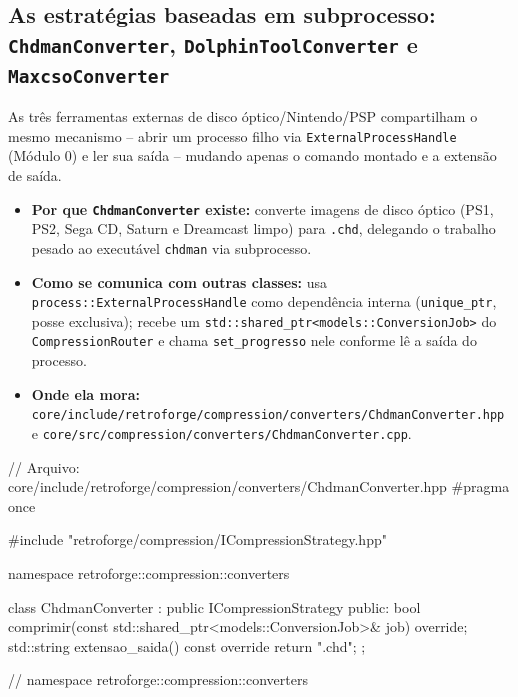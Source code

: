 \subsection{As estratégias baseadas em subprocesso: \texttt{ChdmanConverter}, \texttt{DolphinToolConverter} e \texttt{MaxcsoConverter}}

As três ferramentas externas de disco óptico/Nintendo/PSP compartilham o mesmo mecanismo -- abrir um processo filho via \texttt{ExternalProcessHandle} (Módulo 0) e ler sua saída -- mudando apenas o comando montado e a extensão de saída.

\begin{itemize}
    \item \textbf{Por que \texttt{ChdmanConverter} existe:} converte imagens de disco óptico (PS1, PS2, Sega CD, Saturn e Dreamcast limpo) para \texttt{.chd}, delegando o trabalho pesado ao executável \texttt{chdman} via subprocesso.
    \item \textbf{Como se comunica com outras classes:} usa \texttt{process::ExternalProcessHandle} como dependência interna (\texttt{unique\_ptr}, posse exclusiva); recebe um \texttt{std::shared\_ptr<models::ConversionJob>} do \texttt{CompressionRouter} e chama \texttt{set\_progresso} nele conforme lê a saída do processo.
    \item \textbf{Onde ela mora:} \texttt{core/include/retroforge/compression/converters/ChdmanConverter.hpp} e \texttt{core/src/compression/converters/ChdmanConverter.cpp}.
\end{itemize}

\begin{CaixaCodigo}
// Arquivo: core/include/retroforge/compression/converters/ChdmanConverter.hpp
#pragma once

#include "retroforge/compression/ICompressionStrategy.hpp"

namespace retroforge::compression::converters {

class ChdmanConverter : public ICompressionStrategy {
public:
    bool comprimir(const std::shared_ptr<models::ConversionJob>& job) override;
    std::string extensao_saida() const override { return ".chd"; }
};

} // namespace retroforge::compression::converters
\end{CaixaCodigo}

